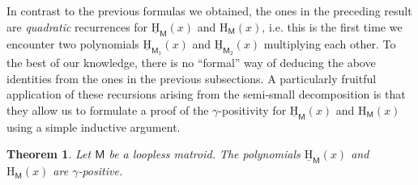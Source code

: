 \documentclass[11pt, a4paper, english]{amsart}
\theoremstyle{teoremas}
\newtheorem{theorem}{Theorem}[section]
\theoremstyle{definition}
\newcommand{\M}{\mathsf{M}}
\renewcommand{\H}{\mathrm{H}}
\newcommand{\uH}{\underline{\mathrm{H}}}
\begin{document}
In contrast to the previous formulas we obtained, the ones in the preceding result are \emph{quadratic} recurrences for $\uH_{\M}(x)$ and $\H_{\M}(x)$, i.e. this is the first time we encounter two polynomials $\uH_{\M_1}(x)$ and $\uH_{\M_2}(x)$ multiplying each other. To the best of our knowledge, there is no ``formal'' way of deducing the above identities from the ones in the previous subsections. A particularly fruitful application of these recursions arising from the semi-small decomposition is that they allow us to formulate a proof of the $\gamma$-positivity for $\uH_{\M}(x)$ and $\H_{\M}(x)$ using a simple inductive argument.


\begin{theorem}\label{thm:gamma-positivity-uH-H}
    Let $\M$ be a loopless matroid. The polynomials $\uH_{\M}(x)$ and $\H_{\M}(x)$ are $\gamma$-positive.
\end{theorem}
\end{document}
